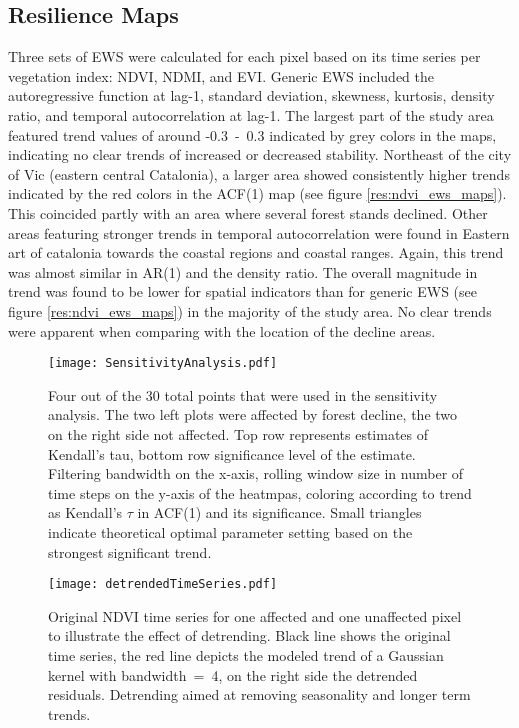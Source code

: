 \subsection{Resilience Maps}\label{res_ews_maps}
Three sets of EWS were calculated for each pixel based on its time series per vegetation index: NDVI, NDMI, and EVI. Generic EWS included the autoregressive function at lag-1, standard deviation, skewness, kurtosis, density ratio, and temporal autocorrelation at lag-1.  The largest part of the study area featured trend values of around -0.3~-~0.3 indicated by grey colors in the maps, indicating no clear trends of increased or decreased stability. Northeast of the city of Vic (eastern central Catalonia), a larger area showed consistently higher trends indicated by the red colors in the ACF(1) map (see figure \ref{res:ndvi_ews_maps}). This coincided partly with an area where several forest stands declined. Other areas featuring stronger trends in temporal autocorrelation were found in Eastern art of catalonia towards the coastal regions and coastal ranges. Again, this trend was almost similar in AR(1) and the density ratio. The overall magnitude in trend was found to be lower for spatial indicators than for generic EWS (see figure \ref{res:ndvi_ews_maps}) in the majority of the study area. No clear trends were apparent when comparing with the location of the decline areas.\\


\begin{figure}[htpb]
	\centering
	\texttt{[image: SensitivityAnalysis.pdf]}
	\caption{Four out of the 30 total points that were used in the sensitivity analysis. The two left plots were affected by forest decline, the two on the right side not affected. Top row represents estimates of Kendall's tau, bottom row significance level of the estimate. Filtering bandwidth on the x-axis, rolling window size in number of time steps on the y-axis of the heatmpas, coloring according to trend as Kendall's $\tau$ in ACF(1) and its significance. Small triangles indicate theoretical optimal parameter setting based on the strongest significant trend.}\label{res:sensitivity}
\end{figure}	

\begin{figure}[htpb]
	\centering
	\texttt{[image: detrendedTimeSeries.pdf]}
	\caption{Original NDVI time series for one affected and one unaffected pixel to illustrate the effect of detrending. Black line shows the original time series, the red line depicts the modeled trend of a Gaussian kernel with bandwidth~=~4, on the right side the detrended residuals. Detrending aimed at removing seasonality and longer term trends.}\label{res:detrended_time_series}
\end{figure}
\restoregeometry{}


